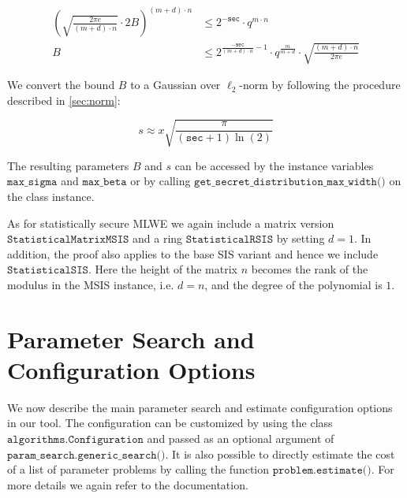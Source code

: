 
\begin{align}
    \left(\sqrt{\frac{2 \pi e}{(m+d) \cdot n}} \cdot 2 B\right)^{(m+d) \cdot n} & \leq 2^{-\texttt{sec}} \cdot q^{m\cdot n}                                                                       \\
    B                                                                           & \leq 2^{\frac{-\texttt{sec}}{(m+d)\cdot n} - 1} \cdot q^\frac{m}{m+d} \cdot \sqrt{\frac{(m+d)\cdot n}{2 \pi e}}
\end{align}

We convert the bound $B$ to a Gaussian over $\ell_2$-norm by following the procedure described in \cref{sec:norm}: %

\begin{equation}
    s  \approx x \sqrt{\frac{\pi}{(\texttt{sec} + 1) \ln(2)}}
\end{equation}

The resulting parameters $B$ and $s$ can be accessed by the instance variables $\texttt{max\_sigma}$ and $\texttt{max\_beta}$ or by calling $\texttt{get\_secret\_distribution\_max\_width()}$ on the class instance.

As for statistically secure MLWE we again include a matrix version $\texttt{StatisticalMatrixMSIS}$ and a ring $\texttt{StatisticalRSIS}$ by setting $d=1$. In addition, the proof also applies to the base SIS variant and hence we include $\texttt{StatisticalSIS}$. Here the height of the matrix $n$ becomes the rank of the modulus in the MSIS instance, i.e. $d=n$, and the degree of the polynomial is $1$.




\section{Parameter Search and Configuration Options}
We now describe the main parameter search and estimate configuration options in our tool. The configuration can be customized by using the class $\texttt{algorithms.Configuration}$ and passed as an optional argument of $\texttt{param\_search.generic\_search()}$. It is also possible to directly estimate the cost of a list of parameter problems by calling the function $\texttt{problem.estimate()}$. For more details we again refer to the documentation.

